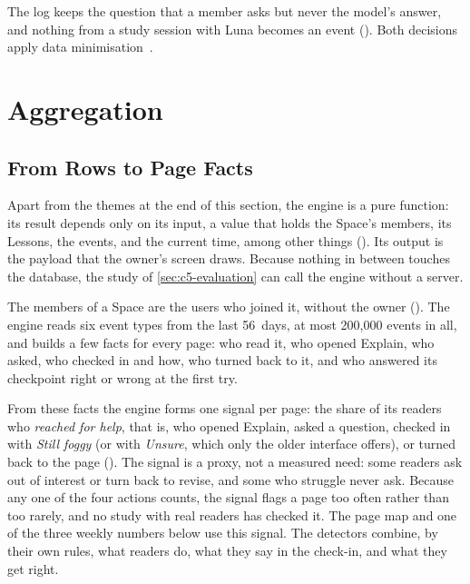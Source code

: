 The log keeps the question that a member asks but never the model's answer,
and nothing from a study session with Luna becomes an event
(). Both decisions
apply data minimisation~\cite[Art.~5(1)(c)]{gdpr2016}.

\section{Aggregation}
\label{sec:c5-aggregation}

\subsection{From Rows to Page Facts}

Apart from the themes at the end of this section, the engine is a pure
function: its result depends only on its input, a value that holds the
Space's members, its Lessons, the events, and the current time, among other
things (). Its
output is the payload that the owner's screen draws. Because nothing in
between touches the database, the study of \cref{sec:c5-evaluation} can call
the engine without a server.

The members of a Space are the users who joined it, without the owner
(). The engine reads six event
types from the last 56~days, at most 200{,}000 events in all, and builds a few
facts for every page: who read it, who opened Explain, who asked, who checked
in and how, who turned back to it, and who answered its checkpoint right or
wrong at the first try.

From these facts the engine forms one signal per page: the share of its
readers who \emph{reached for help}, that is, who opened Explain, asked a
question, checked in with \emph{Still foggy} (or with \emph{Unsure}, which
only the older interface offers), or turned back to the page
(). The signal is a proxy,
not a measured need: some readers ask out of interest or turn back to revise,
and some who struggle never ask. Because any one of the four actions counts,
the signal flags a page too often rather than too rarely, and no study with
real readers has checked it. The page map and one of the three weekly numbers
below use this signal. The detectors combine, by their own rules, what readers
do, what they say in the check-in, and what they get right.

